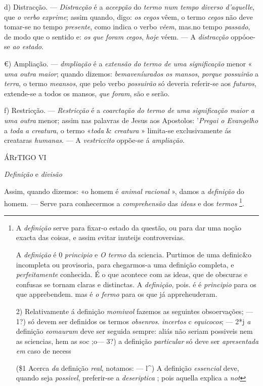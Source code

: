 d) Distracção. --- \emph{Distracção} é a \emph{aceepção} do \emph{termo num tempo diverso d'aquelle}, que \emph{o verbo exprime}; assim quando, digo: \emph{os cegos} vêem, o termo \emph{cegos} não deve tomar-se no tempo \emph{presente}, como indica o verbo \emph{vêem}, mas.no tempo \emph{passado}, de modo que o sentido e: \emph{os que foram cegos}, \emph{hoje} véem. --- A \emph{distracção} oppóoe-se \emph{ao estado}.

€) Ampliação. --- \emph{dmpliação} é a \emph{extensão do termo de uma significação} menor « \emph{uma outra maior}; quando dizemos: \emph{bemaveníurados os mansos}, \emph{porque possuirão} a \emph{terra}, o termo \emph{meansos}, que pelo verbo \emph{possuirão} só deveria referir-se aos \emph{futuros}, extende-se a todos os mansos, \emph{que foram}, são e serão.

f) Restricção. --- \emph{Restricção} é a \emph{coarctação do termo de uma significação maior a uma outra} menor; assim nas palavras de Jesus aos Apostolos: '\emph{Pregai o Evangelho} a \emph{toda a creatura}, o termo «\emph{toda} \& \emph{creatura} » limita-se exclusivamente ás creataras \emph{humanas}. --- A \emph{vestriccito} oppõe-se á \emph{ampliação}.

ÁRrTIGO VI

\emph{Definição} e \emph{divisão}


  
Assim, quando dizemos: «o homem é \emph{animal racional} », damos a \emph{definição} do homem. --- Serve para conhecermos a \emph{comprehensão} das \emph{ideas} e dos \emph{termos} \footnote{A \emph{definição} serve para fixar-o estado da questão, ou para dar uma noção exacta das coisas, e assim evitar inuteijs controversias.\par A \emph{definição} é 0 \emph{principio} e \emph{O termo} da sciencia. Purtimos de uma definic\&o incompleta ou provisoria, para chegarmos-a uma definição completa, e \emph{perfeitamente} conhecida. É o que acontece com as ideas, que de obscuras e confusas se tornam claras e distinctas. A \emph{definição}, pois. é é \emph{principio} para os que apprebendem. mas é \emph{o fermo} para os que já appreheuderam.\par 2) Relativamente á definição \emph{momiwol} fazemos as seguintes obsoervações; --- 1?) só devem ser definidos os termos \emph{obsenros}. \emph{incertos} c \emph{equicocos}; --- 2*j \emph{a} definição \emph{eomaurum} deve ser seguida sempre: aliás não seriam possiveis nem as sciencias, hem as soc ;o--- 3?) a definição \emph{particular} só deve ser \emph{apresentada em} caso de necess\par (\$1 Acerca \emph{da} definição \emph{real}, notamos: --- l\textasciicircum{}) A definição \emph{essencial} deve, quando seja \emph{possivel}, preferir-se a \emph{deseriptica} ; pois aquella explica a \emph{not}}.

